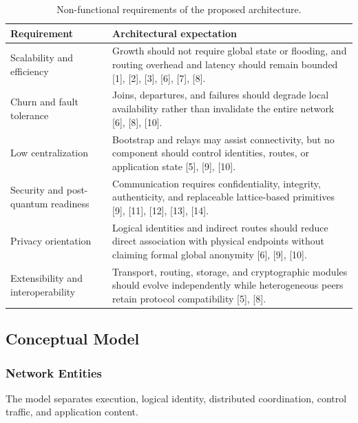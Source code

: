 \documentclass[12pt]{article}
\begin{document}
\begin{table}[H]
\centering
\caption{Non-functional requirements of the proposed architecture.}
\label{tab:non-functional-requirements}
\begin{tabularx}{\textwidth}{L{0.27\textwidth} Y}
\toprule
\textbf{Requirement} & \textbf{Architectural expectation} \\
\midrule
Scalability and efficiency & Growth should not require global state or flooding, and routing overhead and latency should remain bounded [1], [2], [3], [6], [7], [8]. \\
Churn and fault tolerance & Joins, departures, and failures should degrade local availability rather than invalidate the entire network [6], [8], [10]. \\
Low centralization & Bootstrap and relays may assist connectivity, but no component should control identities, routes, or application state [5], [9], [10]. \\
Security and post-quantum readiness & Communication requires confidentiality, integrity, authenticity, and replaceable lattice-based primitives [9], [11], [12], [13], [14]. \\
Privacy orientation & Logical identities and indirect routes should reduce direct association with physical endpoints without claiming formal global anonymity [6], [9], [10]. \\
Extensibility and interoperability & Transport, routing, storage, and cryptographic modules should evolve independently while heterogeneous peers retain protocol compatibility [5], [8]. \\
\bottomrule
\end{tabularx}
\end{table}

\subsection{Conceptual Model}

\subsubsection{Network Entities}

The model separates execution, logical identity, distributed coordination, control traffic, and application content.
\end{document}
